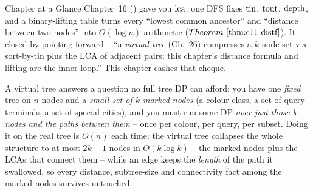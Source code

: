 
\begin{chaptertheorybox}{Chapter at a Glance}
Chapter~16 () gave you \(\operatorname{lca}\): one DFS fixes \(\operatorname{tin}\), \(\operatorname{tout}\),
\(\operatorname{depth}\), and a binary-lifting table turns every ``lowest common ancestor'' and
``distance between two nodes'' into \(O(\log n)\) arithmetic
(\(\thmref{c11-distf}\)).  It closed by pointing forward -- ``a \emph{virtual tree}
(Ch.~26) compresses a \(k\)-node set via sort-by-tin plus the LCA of adjacent
pairs; this chapter's distance formula and lifting are the inner loop.''  This
chapter cashes that cheque.

A virtual tree answers a question no full tree DP can afford: you have one
\emph{fixed} tree on \(n\) nodes and a \emph{small set of \(k\) marked nodes}
(a colour class, a set of query terminals, a set of special cities), and you must
run some DP \emph{over just those \(k\) nodes and the paths between them} -- once
per colour, per query, per subset.  Doing it on the real tree is \(O(n)\) each
time; the virtual tree collapses the whole structure to at most \(2k-1\) nodes in
\(O(k\log k)\) -- the marked nodes plus the LCAs that connect them -- while an edge
keeps the \emph{length} of the path it swallowed, so every distance, subtree-size
and connectivity fact among the marked nodes survives untouched.


\end{chaptertheorybox}
